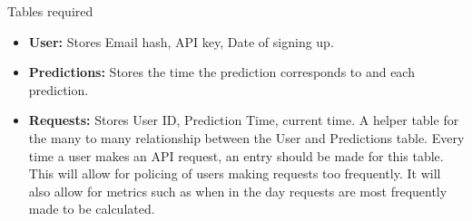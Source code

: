         Tables required 
        \begin{itemize}

            \item \textbf{User:} Stores Email hash, API key, Date of signing up. 

            \item \textbf{Predictions:} Stores the time the prediction corresponds to and each prediction.
            
            \item \textbf{Requests:} Stores User ID, Prediction Time, current time. A helper table for the many to many relationship between the User and Predictions table. Every time a user makes an API request, an entry should be made for this table. This will allow for policing of users making requests too frequently. It will also allow for metrics such as when in the day requests are most frequently made to be calculated. 

        \end{itemize}
        
            